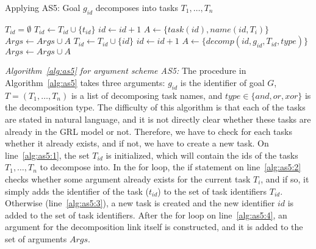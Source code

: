 \begin{algorithm}[h]
  \caption{Applying AS5: Goal $g_{id}$ decomposes into tasks $T_1,\ldots,T_n$}\label{alg:as5}
  \begin{algorithmic}[1]
    \State $T_{id} = \emptyset$\label{alg:as5:1}
        \State $T_{id} \gets T_{id} \cup \{t_{id}\}$
      \Else\label{alg:as5:3}
        \State $id\gets id+1$
        \State $A \gets \{task(id),name(id,T_i)\}$
        \State $Args \gets Args\cup A$
        \State $T_{id} \gets T_{id} \cup \{id\}$
      \EndIf
    \EndFor
    \State $id\gets id+1$\label{alg:as5:4}
    \State $A\gets \{decomp(id, g_{id}, T_{id}, type)\}$
    \State $Args \gets Args\cup A$
    \EndProcedure
  \end{algorithmic}
\end{algorithm}

\emph{Algorithm~\ref{alg:as5} for argument scheme AS5:} The procedure in Algorithm~\ref{alg:as5} takes three arguments: $g_{id}$ is the identifier of goal $G$, $T=(T_1,\ldots,T_n)$ is a list of decomposing task names, and $type\in\{and,or,xor\}$ is the decomposition type. The difficulty of this algorithm is that each of the tasks are stated in natural language, and it is not directly clear whether these tasks are already in the GRL model or not. Therefore, we have to check for each tasks whether it already exists, and if not, we have to create a new task. On line~\ref{alg:as5:1}, the set $T_{id}$ is initialized, which will contain the ids of the tasks $T_1,\ldots,T_n$ to decompose into. In the for loop, the if statement on line~\ref{alg:as5:2} checks whether some argument already exists for the current task $T_i$, and if so, it simply adds the identifier of the task ($t_{id}$) to the set of task identifiers $T_{id}$. Otherwise (line~\ref{alg:as5:3}), a new task is created and the new identifier $id$ is added to the set of task identifiers. After the for loop on line~\ref{alg:as5:4}, an argument for the decomposition link itself is constructed, and it is added to the set of arguments $Args$.

